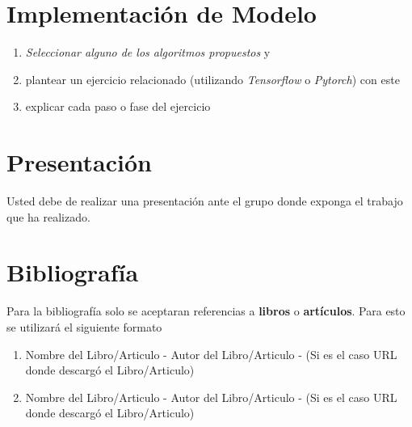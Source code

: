 \documentclass[12pt]{article}
\begin{document}
\section*{Implementación de Modelo}

\begin{enumerate}
    \item \textit{Seleccionar alguno de los algoritmos propuestos} y
    \item plantear un ejercicio relacionado (utilizando \textit{Tensorflow} o \textit{Pytorch}) con este
    \item explicar cada paso o fase del ejercicio
\end{enumerate}





\section*{Presentación}

Usted debe de realizar una presentación ante el grupo donde exponga el trabajo que ha realizado.




\section*{Bibliografía}

Para la bibliografía solo se aceptaran referencias a \textbf{libros} o \textbf{artículos}. Para esto se utilizará el siguiente formato

\begin{enumerate}
    \item Nombre del Libro/Articulo - Autor del Libro/Articulo - (Si es el caso URL donde descargó el Libro/Articulo) 
    
    \item Nombre del Libro/Articulo - Autor del Libro/Articulo - (Si es el caso URL donde descargó el Libro/Articulo) 
\end{enumerate}
\end{document}
